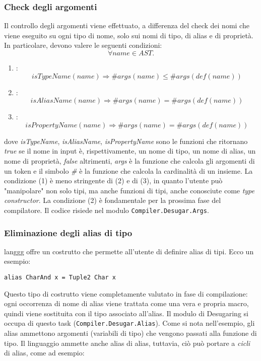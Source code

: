 \documentclass[10pt,a4paper]{article}
\begin{document}
\subsubsection{Check degli argomenti}
Il controllo degli argomenti viene effettuato, a differenza del check dei nomi che viene eseguito su ogni tipo di nome,
solo sui nomi di tipo, di alias e di proprietà. In particolare, devono valere le seguenti condizioni:
\[ \forall name \in AST. \]
\begin{enumerate}
    \item:
        \[ isTypeName(name) \Longrightarrow \# args(name) \leq \#args(def(name)) \]
    \item:
        \[ isAliasName(name) \Longrightarrow \#args(name) = \#args(def(name)) \]
    \item:
        \[ isPropertyName(name) \Longrightarrow \#args(name) = \#args(def(name)) \]
\end{enumerate}
dove \textit{isTypeName}, \textit{isAliasName}, \textit{isPropertyName} sono le funzioni che ritornano \textit{true}
se il nome in input è, rispettivamente, un nome di tipo, un nome di alias, un nome di proprietà, \textit{false} altrimenti,
\textit{args} è la funzione che calcola gli argomenti di un token e il simbolo \textit{\#} è la funzione che calcola
la cardinalità di un insieme. La condizione (1) è meno stringente di (2) e di (3),
in quanto l'utente può "manipolare" non solo tipi, ma anche funzioni di tipi,
anche conosciute come \textit{type constructor}. La condizione (2) è fondamentale per la prossima fase del compilatore.
Il codice risiede nel modulo \texttt{Compiler.Desugar.Args}.

\subsubsection{Eliminazione degli alias di tipo}
langgg offre un costrutto che permette all'utente di definire alias di tipi. Ecco un esempio:

\begin{lstlisting}
alias CharAnd x = Tuple2 Char x
\end{lstlisting}

Questo tipo di costrutto viene completamente valutato in fase di compilazione: ogni occorrenza di nome di alias viene
trattata come una vera e propria macro, quindi viene sostituita con il tipo associato all'alias. Il modulo di Desugaring
si occupa di questo task (\texttt{Compiler.Desugar.Alias}).
Come si nota nell'esempio, gli alias ammettono argomenti (variabili di tipo) che vengono passati alla funzione di tipo.
Il linguaggio ammette anche alias di alias, tuttavia, ciò può portare a \textit{cicli} di alias, come ad esempio:
\end{document}
